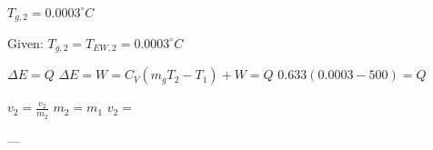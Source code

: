 \( T_{g,2} = 0.0003^\circ C \)  

Given:  
\( T_{g,2} = T_{EW,2} = 0.0003^\circ C \)  

\( \Delta E = Q \)  
\( \Delta E = W = C_V (m_g T_2 - T_1) + W = Q \)  
\( 0.633 (0.0003 - 500) = Q \)  

\( v_{2} = \frac{v_2}{m_2} \)  
\( m_2 = m_1 \)  
\( v_2 = \)  

---
